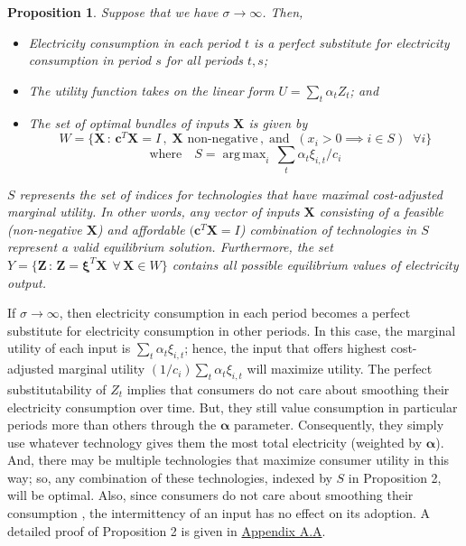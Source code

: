 \documentclass[11pt,a4paper,leqno]{extarticle}
\newtheorem{proposition}{Proposition}
\DeclareMathOperator*{\argmax}{arg\,max}
\begin{document}
	\begin{proposition}
		Suppose that we have $\sigma \to \infty$. Then, 
		\begin{itemize}
			\item Electricity consumption in each period $t$ is a perfect substitute for electricity consumption in period $s$ for all periods $t,s$; 
			\item The utility function takes on the linear form $U = \sum_t \alpha_t Z_t$; and
			\item The set of optimal bundles of inputs $\mathbf{X}$ is given by 
			$$
			W =
			\{ \mathbf{X} \, : \, \mathbf{c}^T \mathbf{X} = I \,,\;  \mathbf{X} \text{ non-negative} \,,\; \text{and} \;\;  (x_i > 0 \implies i \in S) \;\; \forall i \}
			$$
			$$\text{where} \quad S = \argmax_i \, \sum_t \alpha_t \xi_{i,t}/c_i$$
		\end{itemize}
		$S$ represents the set of indices for technologies that have maximal cost-adjusted marginal utility. In other words, any vector of inputs $\mathbf{X}$ consisting of a feasible (non-negative $\mathbf{X}$) and affordable $(\mathbf{c}^T \mathbf{X} = I$) combination of technologies in $S$ represent a valid equilibrium solution. Furthermore, the set $Y = \{ \mathbf{Z} \,: \, \mathbf{Z} = \boldsymbol{\xi}^T \mathbf{X}  \; \, \forall \, \mathbf{X} \in W \}$ contains all possible equilibrium values of electricity output. 
	\end{proposition}
		
	If $\sigma \to \infty$, then electricity consumption in each period becomes a perfect substitute for electricity consumption in other periods. In this case, the marginal utility of each input is $\sum_t \alpha_t \xi_{i,t}$; hence, the input that offers highest cost-adjusted marginal utility $(1/c_i) \sum_t \alpha_t \xi_{i,t}$ will maximize utility. The perfect substitutability of $Z_t$ implies that consumers do not care about smoothing their electricity consumption over time. But, they still value consumption in particular periods more than others through the $\boldsymbol{\alpha}$ parameter. Consequently, they simply use whatever technology gives them the most total electricity (weighted by $\boldsymbol{\alpha}$). And, there may be multiple technologies that maximize consumer utility in this way; so, any combination of these technologies, indexed by $S$ in Proposition 2, will be optimal. Also, since consumers do not care about smoothing their consumption , the intermittency of an input has no effect on its adoption. A detailed proof of Proposition 2 is given in \hyperref[sec:cobbdoug]{Appendix A.A}. 	
	
\end{document}

